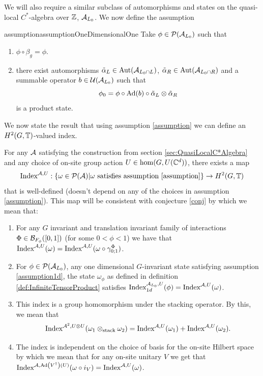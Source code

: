 \documentclass[11pt,a4paper,twoside]{article}
\numberwithin{equation}{section}
\begin{document}
	We will also require a similar subclass of automorphisms and states on the quasi-local $C^*$-algebra over $\ZZ$, $\AA_{L_0}$. We now define the assumption
	\begin{restatable}{assumption}{assumptionOneDimensionalOne}\label{assumption1d}
		Take $\phi\in\PP(\AA_{L_0})$ such that
		\begin{enumerate}
			\item $\phi\circ\beta_g=\phi$.
			\item there exist automorphisms $\tilde\alpha_L\in\Aut{\AA_{L_0\cap L}}$, $\tilde\alpha_R\in\Aut{\AA_{L_0\cap R}}$ and a summable operator $b\in\UU(\AA_{L_0})$ such that
			\begin{equation}
				\phi_0=\phi\circ\Ad{b}\circ\tilde\alpha_{L}\otimes\tilde\alpha_{R}
			\end{equation}
			is a product state.
		\end{enumerate}
	\end{restatable}
	We now state the result that using assumption \ref{assumption} we can define an $H^2(G,\TT)$-valued index.
	\begin{theorem}\label{thrm:ExistenceFirstIndex}
		For any $\AA$ satisfying the construction from section \ref{sec:QuasiLocalC*Algebra} and any choice of on-site group action $U\in\hom(G,U(\CC^d))$, there exists a map
		\begin{equation}
			\textrm{Index}^{\AA,U}:\{\omega\in\PP(\AA)|\omega\text{ satisfies assumption \ref{assumption}}\}\rightarrow H^2(G,\TT)
		\end{equation}
		that is well-defined (doesn't depend on any of the choices in assumption \ref{assumption}). This map will be consistent with conjecture \ref{conj} by which we mean that:
		\begin{enumerate}
			\item For any $G$ invariant and translation invariant family of interactions $\Phi\in\BB_{F_{\phi}}([0,1])$ (for some $0<\phi<1$) we have that $\textrm{Index}^{\AA,U}(\omega)=\textrm{Index}^{\AA,U}(\omega\circ\gamma^{\Phi}_{0;1})$.
			\item For $\phi\in\PP(\AA_{L_0})$, any one dimensional $G$-invariant state satisfying assumption \ref{assumption1d}, the state $\omega_\phi$ as defined in definition \ref{def:InfiniteTensorProduct} satisfies $\textrm{Index}^{\AA_{L_0},U}_{1d}(\phi)=\textrm{Index}^{\AA,U}(\omega)$.
			\item This index is a group homomorphism under the stacking operator. By this, we mean that
			\begin{equation}
				\textrm{Index}^{\AA^2,U\otimes U}(\omega_1\otimes_{\text{stack}}\omega_2)=\textrm{Index}^{\AA,U}(\omega_1)+\textrm{Index}^{\AA,U}(\omega_2).
			\end{equation}
			\item The index is independent on the choice of basis for the on-site Hilbert space by which we mean that for any on-site unitary $V$ we get that $\textrm{Index}^{\AA,\Ad{V^\dagger}(U)}(\omega\circ i_V)=\textrm{Index}^{\AA,U}(\omega)$.
		\end{enumerate}
	\end{theorem}
\end{document}
